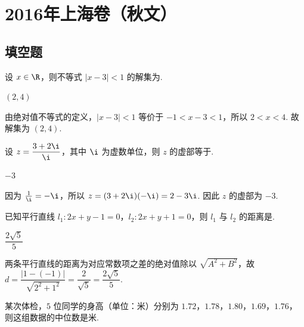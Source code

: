 \chapter{2016年上海卷（秋文）}

\section{填空题}

\begin{problem}
设 \(x\in\R\)，则不等式 \(|x-3|<1\) 的解集为\fillinblank{}.
\end{problem}

\begin{answer}
\((2,4)\)
\end{answer}

\begin{solution}
由绝对值不等式的定义，\(|x-3|<1\) 等价于 \(-1<x-3<1\)，所以 \(2<x<4\). 故解集为 \((2,4)\).
\end{solution}

\begin{problem}
设 \(z=\dfrac{3+2\i}{\i}\)，其中 \(\i\) 为虚数单位，则 \(z\) 的虚部等于\fillinblank{}.
\end{problem}

\begin{answer}
\(-3\)
\end{answer}

\begin{solution}
因为 \(\frac{1}{\i}=-\i\)，所以 \(z=(3+2\i)(-\i)=2-3\i\). 因此 \(z\) 的虚部为 \(-3\).
\end{solution}

\begin{problem}
已知平行直线 \(l_1:2x+y-1=0\)，\(l_2:2x+y+1=0\)，则 \(l_1\) 与 \(l_2\) 的距离是\fillinblank{}.
\end{problem}

\begin{answer}
\(\dfrac{2\sqrt{5}}{5}\)
\end{answer}

\begin{solution}
两条平行直线的距离为对应常数项之差的绝对值除以 \(\sqrt{A^2+B^2}\)，故 \(d=\dfrac{|1-(-1)|}{\sqrt{2^2+1^2}}=\dfrac{2}{\sqrt5}=\dfrac{2\sqrt5}{5}\).
\end{solution}

\begin{problem}
某次体检，\(5\) 位同学的身高（单位：米）分别为 \(1.72\)，\(1.78\)，\(1.80\)，\(1.69\)，\(1.76\)，则这组数据的中位数是\fillinblank{}\(\text{米}\).
\end{problem}

